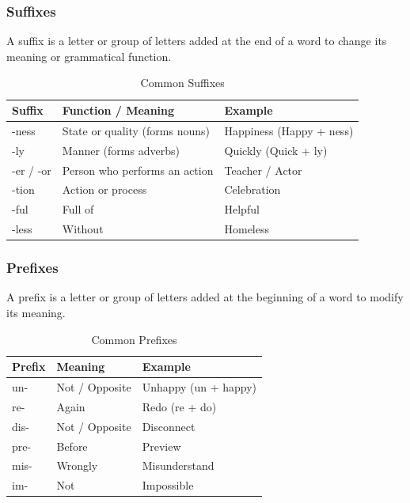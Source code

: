 \subsubsection{Suffixes}

A suffix is a letter or group of letters added at the end of a word to change its meaning or grammatical function.

\begin{table}[h!]
    \centering
    \begin{tabular}{|l|l|l|}
    \hline
    \textbf{Suffix} & \textbf{Function / Meaning} & \textbf{Example} \\ \hline
    -ness & State or quality (forms nouns) & Happiness (Happy + ness) \\ \hline
    -ly & Manner (forms adverbs) & Quickly (Quick + ly) \\ \hline
    -er / -or & Person who performs an action & Teacher / Actor \\ \hline
    -tion & Action or process & Celebration \\ \hline
    -ful & Full of & Helpful \\ \hline
    -less & Without & Homeless \\ \hline
    \end{tabular}
    \caption{Common Suffixes}
\end{table}

\subsubsection{Prefixes}

A prefix is a letter or group of letters added at the beginning of a word to modify its meaning.

\begin{table}[h!]
    \centering
    \begin{tabular}{|l|l|l|}
    \hline
    \textbf{Prefix} & \textbf{Meaning} & \textbf{Example} \\ 
    \hline
    un- & Not / Opposite & Unhappy (un + happy) \\ 
    \hline
    re- & Again & Redo (re + do) \\ 
    \hline
    dis- & Not / Opposite & Disconnect \\ 
    \hline
    pre- & Before & Preview \\ 
    \hline
    mis- & Wrongly & Misunderstand \\ 
    \hline
    im- & Not & Impossible \\ 
    \hline
    \end{tabular}
    \caption{Common Prefixes}
\end{table}

